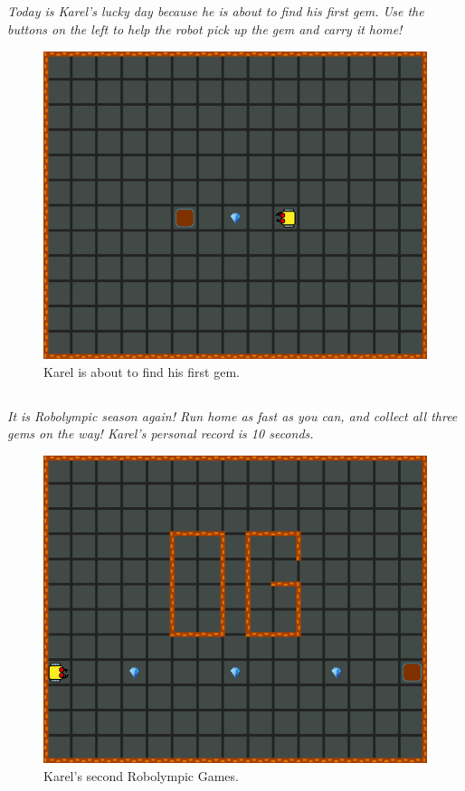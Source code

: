 \documentclass[article,A4,12pt]{llncs}
\begin{document}
\subsection{}

{\em Today is Karel's lucky day because he is about to find his first gem. 
Use the buttons on the left to help the robot pick up the gem and carry it 
home!}

\begin{figure}[!ht]
\begin{center}
\includegraphics[height=0.4\textwidth]{imgk/a03.png}
\end{center}
\vspace{-4mm}
\caption{Karel is about to find his first gem.}
\label{fig:a03}
\vspace{-1cm}
\end{figure}
\noindent

\subsection{}

{\em It is Robolympic season again! Run home as fast as you can, 
and collect all three gems on the way! Karel's personal record is 10 seconds.}


\begin{figure}[!ht]
\begin{center}
\includegraphics[height=0.4\textwidth]{imgk/a04.png}
\end{center}
\vspace{-4mm}
\caption{Karel's second Robolympic Games.}
\label{fig:a04}
\vspace{-1cm}
\end{figure}
\noindent
\end{document}
